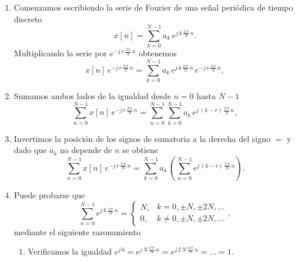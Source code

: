 \begin{enumerate}
\item Comenzamos escribiendo la serie de Fourier de una se\~{n}al peri\'{o}dica de tiempo discreto 
\begin{equation}
        x\left[ n\right] =
                \sum_{k=0}^{N-1}a_{k} \, e^{j \, k \, \frac{2 \, \pi }{N} \, n}.
\end{equation}
Multiplicando la serie por $e^{-j \, r \, \frac{2 \, \pi }{N} \, n}$ obtenemos 
\begin{equation}
        x\left[ n\right] \, e^{-j \, r \, \frac{2 \, \pi }{N} \, n}=
                \sum_{k=0}^{N-1}a_{k} \, e^{j \, k \, \frac{2 \, \pi }{N} \, n} \, e^{-j \, r \, \frac{2 \, \pi }{N} \, n},
\end{equation}

\item Sumamos ambos lados de la igualdad desde $n=0$ hasta $N-1$
\begin{equation}
        \sum_{n=0}^{N-1}x\left[ n\right] \, e^{-j \, r \, \frac{2 \, \pi }{N} \, n}
        =
        \sum_{n=0}^{N-1}\sum_{k=0}^{N-1}a_{k} \, e^{j \, \left( k-r\right) \, \frac{2 \, \pi }{N} \, n},
\end{equation}

\item Invertimos la posici\'{o}n de los signos de sumatoria a la derecha del signo $=$ y dado que $a_{k}$ no depende de $n$ se obtiene 
\begin{equation}
        \sum_{n=0}^{N-1}x\left[ n\right] \, e^{-j \, r \, \frac{2 \, \pi }{N} \, n}=
                \sum_{k=0}^{N-1}a_{k} \,
                        \left( \sum_{n=0}^{N-1} e^{j \, \left( k-r\right) \, \frac{2 \, \pi }{N}\, n}
                        \right) .
\end{equation}

\item Puede probarse que 
\begin{equation}
\sum_{n=0}^{N-1}e^{j \, k \, \frac{2 \, \pi }{N}\, n}=
        \left\{ 
        \begin{array}{l}
                        N, \\ 
                        0,
        \end{array}
        \begin{array}{l}
                k=0,\pm N,\pm 2N,... \\ 
                k\neq 0,\pm N,\pm 2N,...
        \end{array}
        \right. ,
\end{equation}
mediante el siguiente razonamiento
\begin{enumerate}
        \item  Verificamos la igualdad 
               $e^{j \, 0}=e^{j \, N \, \frac{2 \, \pi }{N}\, n}=e^{j \, 2 \, N \, \frac{2 \, \pi}{N}\, n}=...=1.$


\end{enumerate}
\end{enumerate}
